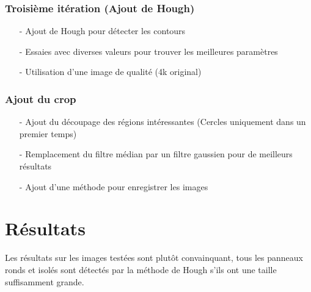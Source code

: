 \documentclass[a4paper,10pt,openany,oneside]{report}
\begin{document}
\subsection{Troisième itération (Ajout de Hough)}
\begin{itemize}
\item[-] Ajout de Hough pour détecter les contours
\item[-] Essaies avec diverses valeurs pour trouver les meilleures paramètres
\item[-] Utilisation d'une image de qualité (4k original)
\end{itemize}

\subsection{Ajout du crop}
\begin{itemize}
\item[-] Ajout du découpage des régions intéressantes (Cercles uniquement dans un premier temps)
\item[-] Remplacement du filtre médian par un filtre gaussien pour de meilleurs résultats
\item[-] Ajout d'une méthode pour enregistrer les images
\end{itemize}



\chapter{Résultats}
Les résultats sur les images testées sont plutôt convainquant, tous les panneaux ronds et isolés sont détectés par la méthode de Hough s'ils ont une taille suffisamment grande.
\end{document}
